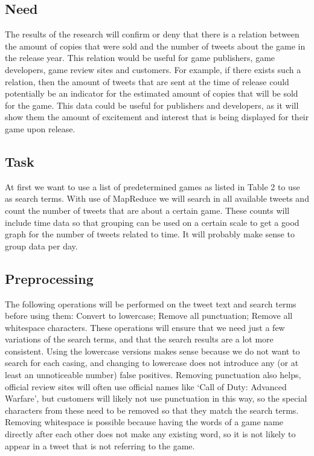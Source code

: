 \subsection{Need}
The results of the research will confirm or deny that there is a relation between the amount of copies that were sold and the number of tweets about the game in the release year. This relation would be useful for game publishers, game developers, game review sites and customers. For example, if there exists such a relation, then the amount of tweets that are sent at the time of release could potentially be an indicator for the estimated amount of copies that will be sold for the game. This data could be useful for publishers and developers, as it will show them the amount of excitement and interest that is being displayed for their game upon release.
\subsection{Task}
At first we want to use a list of predetermined games as listed in Table 2 to use as search terms. With use of MapReduce we will search in all available tweets and count the number of tweets that are about a certain game. These counts will include time data so that grouping can be used on a certain scale to get a good graph for the number of tweets related to time. It will probably make sense to group data per day. 
\subsection{Preprocessing}
The following operations will be performed on the tweet text and search terms before using them:
Convert to lowercase;
Remove all punctuation;
Remove all whitespace characters.
These operations will ensure that we need just a few variations of the search terms, and that the search results are a lot more consistent. Using the lowercase versions makes sense because we do not want to search for each casing, and changing to lowercase does not introduce any (or at least an unnoticeable number) false positives. Removing punctuation also helps, official review sites will often use official names like ‘Call of Duty: Advanced Warfare’, but customers will likely not use punctuation in this way, so the special characters from these need to be removed so that they match the search terms. Removing whitespace is possible because having the words of a game name directly after each other does not make any existing word, so it is not likely to appear in a tweet that is not referring to the game.
